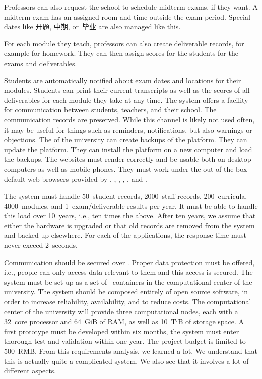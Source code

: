 Professors can also request the school to schedule midterm exams, if they want.
A midterm exam has an assigned room and time outside the exam period.
Special dates like 开题, 中期, or~毕业 are also managed like this.

For each module they teach, professors can also create deliverable records, for example for homework.
They can then assign scores for the students for the exams and deliverables.

Students are automatically notified about exam dates and locations for their modules.
Students can print their current transcripts as well as the scores of all deliverables for each module they take at any time.
\endhsection%
%
%
The system offers a facility for communication between students, teachers, and their school.
The communication records are preserved.
While this channel is likely not used often, it may be useful for things such as reminders, notifications, but also warnings or objections.%
\endhsection%
%
%
The  of the university can create backups of the platform.
They can update the platform.
They can install the platform on a new computer and load the backups.%
\endhsection%
\endhsection%
%
%
The websites must render correctly and be usable both on desktop computers as well as mobile phones.
They must work under the out-of-the-box default web browsers provided by \microsoftWindows, \linux, \macOS, \appleIOS, \iPadOS, and \android.

The system must handle 50~student records, 2000~staff records, 200~curricula, 4000~modules, and 1~exam/deliverable results per year.
It must be able to handle this load over 10~years, i.e., ten times the above.
After ten years, we assume that either the hardware is upgraded or that old records are removed from the system and backed up elsewhere.
For each of the applications, the response time must never exceed 2~seconds.

Communication should be secured over .
Proper data protection must be offered, i.e., people can only access data relevant to them and this access is secured.%
\endhsection%
%
%
The system must be set up as a set of \docker\ containers in the computational center of the university.
The system should be composed entirely of open source software, in order to increase reliability, availability, and to reduce costs.
The computational center of the university will provide three computational nodes, each with a 32~core processor and 64~GiB of RAM, as well as 10~TiB of storage space.
A first prototype must be developed within six months, the system must enter thorough test and validation within one year.
The project budget is limited to 500~RMB.%
\endhsection%
%
%
From this requirements analysis, we learned a lot.
We understand that this is actually quite a complicated system.
We also see that it involves a lot of different aspects.

